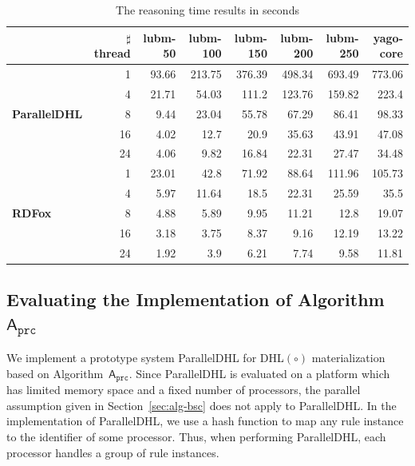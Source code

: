 \begin{table}
\centering
\caption{The reasoning time results in seconds}
{\setlength{\tabcolsep}{1.5mm}
\begin{tabular}{|l|r|r|r|r|r|r|r|}
\hline
&\small$\sharp$thread&lubm-50&lubm-100&lubm-150&lubm-200&lubm-250&yago-core\\
\hline
\multirow{5}{*}{ \small{\textbf{ParallelDHL}}}&1&93.66&213.75&376.39&498.34&693.49&773.06\\
                    &4&21.71&54.03&111.2&123.76&159.82&223.4\\
                    &8&9.44&23.04&55.78&67.29&86.41&98.33\\
                    &16&4.02&12.7&20.9&35.63&43.91&47.08\\
                    &24&4.06&9.82&16.84&22.31&27.47&34.48\\
\hline
\multirow{5}{*}{ \small{\textbf{RDFox}}}&1&23.01&42.8&71.92&88.64&111.96&105.73\\
                    &4&5.97&11.64&18.5&22.31&25.59&35.5\\
                    &8&4.88&5.89&9.95&11.21&12.8&19.07\\
                    &16&3.18&3.75&8.37&9.16&12.19&13.22\\
                    &24&1.92&3.9&6.21&7.74&9.58&11.81\\
\hline
\end{tabular}}
\label{tab:result}
\end{table}


\subsection{Evaluating the Implementation of Algorithm~$\mathsf{A}_{\texttt{prc}}$}

We implement a prototype system ParallelDHL for DHL$(\circ)$ materialization
based on Algorithm~$\mathsf{A}_{\texttt{prc}}$. Since ParallelDHL is
evaluated on a
platform which has limited memory space and a fixed number of processors,
the parallel assumption given in Section~\ref{sec:alg-bsc} does not apply to ParallelDHL.
In the implementation of ParallelDHL, we use a hash function to map any rule instance
to the identifier of some processor. Thus, when performing ParallelDHL,
each processor handles a group of rule instances.

